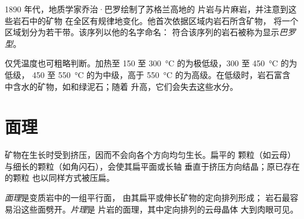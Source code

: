 \begin{history}[巴罗带]
1890 年代，地质学家乔治·巴罗绘制了苏格兰高地的
片岩与片麻岩，并注意到这些岩石中的矿物
在全区有规律地变化。他首次依据区域内岩石所含矿物，
将一个区域划分为若干带。该序列以他的名字命名：
符合该序列的岩石被称为显示\emph{巴罗型}。
\end{history}

仅凭温度也可粗略判断。加热至 150
至 \qty{300}{\celsius} 的为极低级，300 至 \qty{450}{\celsius} 的为低级，
450 至 \qty{550}{\celsius} 的为中级，高于
\qty{550}{\celsius} 的为高级。在低级时，岩石富含
中含水的矿物，如和绿泥石；随着
升高，它们会失去这些水分。

\section{面理}\label{sec:g12:metamorphic-rocks:foliation}

矿物在生长时受到挤压，因而不会向各个方向均匀生长。扁平的
颗粒（如云母）与细长的颗粒（如角闪石），会使其扁平面或长轴
垂直于挤压方向结晶；原已存在的颗粒
也以同样方式被压扁。

\begin{definition}[面理；片理]\label{def:g12:metamorphic-rocks:foliation}
\emph{面理}是变质岩中的一组平行面，
由其扁平或伸长矿物的定向排列形成；
岩石最容易沿这些面劈开。\emph{片理}是
片岩的面理，其中定向排列的云母晶体
大到肉眼可见。
\end{definition}

